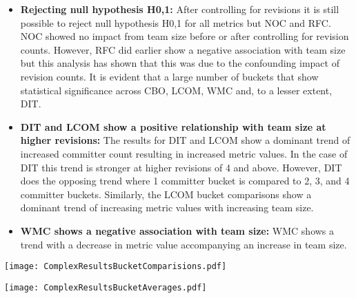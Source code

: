 \begin{itemize}
\item  \textbf{Rejecting null hypothesis H0,1:} After controlling for revisions it is still possible to reject null hypothesis H0,1 for all metrics but NOC and RFC. NOC showed no impact from team size before or after controlling for revision counts. However, RFC did earlier show a negative association with team size but this analysis has shown that this was due to the confounding impact of revision counts.  It is evident that a large number of buckets that show statistical significance across CBO, LCOM, WMC and, to a lesser extent, DIT.

\item  \textbf{DIT and LCOM show a positive relationship with team size at higher revisions:} The results for DIT and LCOM show a dominant trend of increased committer count resulting in increased metric values. In the case of DIT this trend is stronger at higher revisions of 4 and above. However, DIT does the opposing trend where 1 committer bucket is compared to 2, 3, and 4 committer buckets. Similarly, the LCOM bucket comparisons show a dominant trend of increasing metric values with increasing team size.

\item  \textbf{WMC shows a negative association with team size:} WMC shows a  trend with a decrease in metric value accompanying an increase in team size. 
\end{itemize}

\begin{table}
\centering 
\caption{Tabular summary showing the results of each bucket comparison.}
\begin{tabular}
 \centering 
 \texttt{[image: ComplexResultsBucketComparisions.pdf]}
 \label{tab:ComplexResultsBucketComparisions}
\end{tabular}
\end{table}

\begin{table}
\centering 
\caption{Metric mean values for each metric bucket}
\begin{tabular}
 \centering 
 \texttt{[image: ComplexResultsBucketAverages.pdf]}
 \label{tab:ComplexResultsBucketAverages}
\end{tabular}
\end{table}

